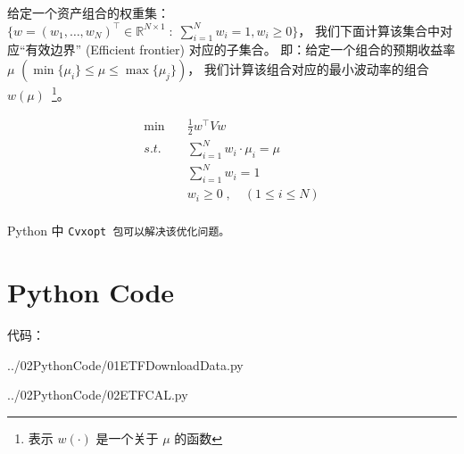 \documentclass[a4paper, 11pt, UTF8]{report}
\begin{document}
给定一个资产组合的权重集：
$\{w = (w_1, \ldots, w_N)^\top \in \mathbb{R}^{N\times 1} 
        \;\colon\; \sum^N_{i=1} w_i = 1, w_i \ge 0 \}$，
我们下面计算该集合中对应“有效边界” (Efficient frontier) 对应的子集合。
即：给定一个组合的预期收益率 $\mu$ 
$( \min\{\mu_i\} \le \mu \le \max\{\mu_j\} )$，
我们计算该组合对应的最小波动率的组合 
$w(\mu)$~\footnote{表示 $w(\cdot)$ 是一个关于 $\mu$ 的函数}。

\begin{align*}
        \min \quad & \frac{1}{2} w^\top V w \\
        s.t.\quad  & \sum^N_{i=1} w_i \cdot \mu_i = \mu \\
                   & \sum^N_{i=1} w_i = 1 \\
                   & w_i \ge 0 \;,  \quad (1 \le i \le N) \\
\end{align*}

Python 中 \tt{Cvxopt} 包可以解决该优化问题。

\section{Python Code}
代码：


                {../02PythonCode/01ETFDownloadData.py}

\newpage

                {../02PythonCode/02ETFCAL.py}
\end{document}
